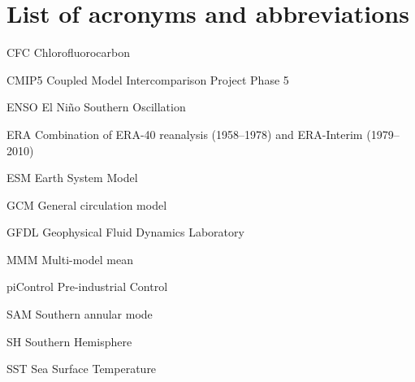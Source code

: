 \chapter*{List of acronyms and abbreviations}

\begin{description*}

\item[CFC] Chlorofluorocarbon
\item[CMIP5] Coupled Model Intercomparison Project Phase 5
\item[ENSO] El Ni\~no Southern Oscillation
\item[ERA] Combination of ERA-40 reanalysis (1958--1978) and ERA-Interim (1979--2010)
\item[ESM] Earth System Model
\item[GCM] General circulation model
\item[GFDL] Geophysical Fluid Dynamics Laboratory
\item[MMM] Multi-model mean
\item[piControl] Pre-industrial Control
\item[SAM] Southern annular mode
\item[SH] Southern Hemisphere
\item[SST] Sea Surface Temperature


\end{description*}



